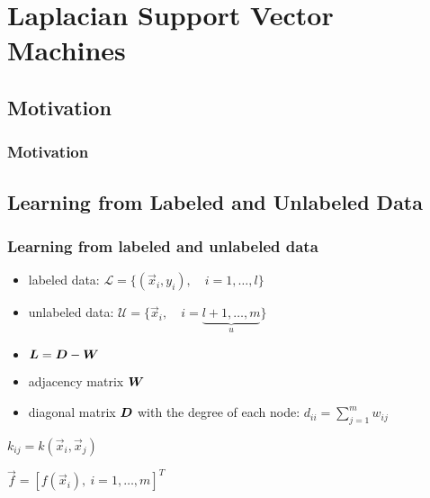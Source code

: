 \section{Laplacian Support Vector Machines}

\subsection{Motivation}

\begin{frame}
  \frametitle{Motivation}
  
  
  \begin{figure}
    \centering

    \quad
    \quad
  \end{figure}
\end{frame}


\subsection{Learning from Labeled and Unlabeled Data}

\begin{frame}
  \frametitle{Learning from labeled and unlabeled data}
  
  
  \begin{itemize}
    \item labeled data: $\mathcal{L} = \{(\vec{x}_i, y_i), \quad i=1,\ldots,l\}$
    \item unlabeled data: $\mathcal{U} = \{\vec{x}_i, \quad i = \underbrace{l+1,\ldots,m}_u\}$
  \end{itemize}
  \pspread
  
  
  \begin{itemize}
    \item ${\bm L} = {\bm D} - {\bm W}$
    \item adjacency matrix ${\bm W}$
    \item diagonal matrix ${\bm D}$ with the degree of each node: $d_{ii} = \sum_{j=1}^m w_{ij}$
  \end{itemize}
  \pspread
  
   $k_{ij} = k(\vec{x}_i, \vec{x}_j)$
  \pspread
  
   $\vec{f} = [f(\vec{x}_i),~i=1,\ldots,m]^T$
\end{frame}


